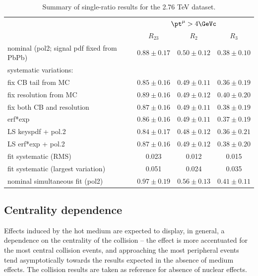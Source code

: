 \begin{table}[!h]
  \centering
  \caption{Summary of single-ratio results for the \Pp\Pp{} 2.76 TeV dataset.}
  \begin{tabular}{l|c|c|c}
    \hline
 &\multicolumn{3}{|c}{$\pt^\mu>4\GeVc$}\\ 
 &\multicolumn{1}{|c}{$R_{23}$}& \multicolumn{1}{|c}{$R_{2}$} & \multicolumn{1}{|c}{$R_{3}$} \\  
\hline
nominal (pol2; signal pdf fixed from PbPb)    & $0.88\pm 0.17$ & $0.50\pm 0.12$ & $0.38\pm 0.10$ \\
\hline
 \multicolumn{4}{l}{systematic variations:} \\
fix CB tail from MC                      & $0.85\pm 0.16$ & $0.49\pm 0.11$ & $0.36\pm0.19 $  \\
fix resolution from MC                   & $0.89\pm 0.16$ & $0.49\pm 0.12$ & $0.40\pm0.20 $  \\
fix both CB and resolution               & $0.87\pm 0.16$ & $0.49\pm 0.11$ & $0.38\pm0.19 $  \\
erf*exp                                  & $0.86\pm 0.16$ & $0.49\pm 0.11$ & $0.37\pm0.19 $   \\  
LS keyspdf + pol.2                       & $0.84\pm 0.17$ & $0.48\pm 0.12$ & $0.36\pm0.21 $   \\  
LS erf*exp + pol.2                       & $0.87\pm 0.16$ & $0.49\pm 0.12$ & $0.38\pm0.20 $   \\  
\hline
fit systematic (RMS)               & 0.023 & 0.012 & 0.015  \\  
fit systematic (largest variation) & 0.051 & 0.024 & 0.035  \\
\hline
nominal simultaneous fit (pol2)  & $0.97\pm 0.19$ & $0.56\pm 0.13$ & $0.41\pm0.11$ \\
\hline
  \end{tabular}
  \label{tab:final-single-rat-pp}
\end{table}


\subsection{Centrality dependence}

Effects induced by the hot medium are expected to display, in general, a dependence on the centrality of the collision -- the effect is more accentuated for the most central collision events, and approaching the most peripheral events tend asymptotically towards the results expected in the absence of medium effects. 
%
The \pp collision results are taken as reference for absence of nuclear effects. 

